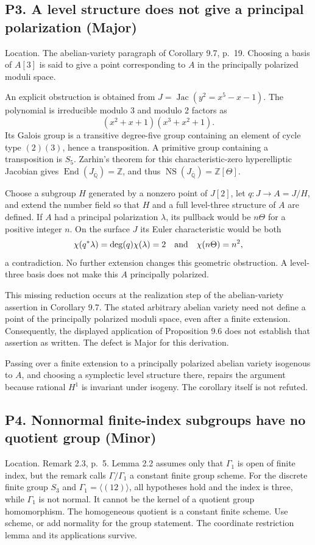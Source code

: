 \documentclass[10pt]{article}
\begin{document}
\subsection*{P3. A level structure does not give a principal polarization (Major)}
Location. The abelian-variety paragraph of Corollary 9.7, p. 19. Choosing a basis of \(A[3]\) is said to give a point corresponding to \(A\) in the principally polarized moduli space.\par
An explicit obstruction is obtained from \(J=\operatorname{Jac}(y^2=x^5-x-1)\). The polynomial is irreducible modulo 3 and modulo 2 factors as \[(x^2+x+1)(x^3+x^2+1).\] Its Galois group is a transitive degree-five group containing an element of cycle type \((2)(3)\), hence a transposition. A primitive group containing a transposition is \(S_5\). Zarhin’s theorem for this characteristic-zero hyperelliptic Jacobian gives \(\operatorname{End}(J_{\overline{\mathbb Q}})=\mathbb Z\), and thus \(\operatorname{NS}(J_{\overline{\mathbb Q}})=\mathbb Z[\Theta]\).\par
Choose a subgroup \(H\) generated by a nonzero point of \(J[2]\), let \(q:J\to A=J/H\), and extend the number field so that \(H\) and a full level-three structure of \(A\) are defined. If \(A\) had a principal polarization \(\lambda\), its pullback would be \(n\Theta\) for a positive integer \(n\). On the surface \(J\) its Euler characteristic would be both \[\chi(q^*\lambda)=\deg(q)\chi(\lambda)=2
       \quad\hbox{and}\quad \chi(n\Theta)=n^2,\] a contradiction. No further extension changes this geometric obstruction. A level-three basis does not make this \(A\) principally polarized.\par
This missing reduction occurs at the realization step of the abelian-variety assertion in Corollary 9.7. The stated arbitrary abelian variety need not define a point of the principally polarized moduli space, even after a finite extension. Consequently, the displayed application of Proposition 9.6 does not establish that assertion as written. The defect is Major for this derivation.\par
Passing over a finite extension to a principally polarized abelian variety isogenous to \(A\), and choosing a symplectic level structure there, repairs the argument because rational \(H^1\) is invariant under isogeny. The corollary itself is not refuted.\par
\subsection*{P4. Nonnormal finite-index subgroups have no quotient group (Minor)}
Location. Remark 2.3, p. 5. Lemma 2.2 assumes only that \(\Gamma_1\) is open of finite index, but the remark calls \(\Gamma/\Gamma_1\) a constant finite group scheme. For the discrete finite group \(S_3\) and \(\Gamma_1=\langle(12)\rangle\), all hypotheses hold and the index is three, while \(\Gamma_1\) is not normal. It cannot be the kernel of a quotient group homomorphism. The homogeneous quotient is a constant finite scheme. Use scheme, or add normality for the group statement. The coordinate restriction lemma and its applications survive.\par
\end{document}
